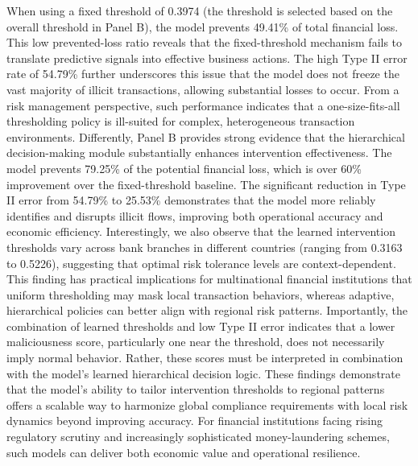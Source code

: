 \documentclass[11pt,english]{article}
\begin{document}
When using a fixed threshold of 0.3974 (the threshold is selected based on the overall threshold in Panel B), the model prevents 49.41\% of total financial loss. This low prevented-loss ratio reveals that the fixed-threshold mechanism fails to translate predictive signals into effective business actions. The high Type II error rate of 54.79\% further underscores this issue that the model does not freeze the vast majority of illicit transactions, allowing substantial losses to occur. From a risk management perspective, such performance indicates that a one-size-fits-all thresholding policy is ill-suited for complex, heterogeneous transaction environments. Differently, Panel B provides strong evidence that the hierarchical decision-making module substantially enhances intervention effectiveness. The model prevents 79.25\% of the potential financial loss, which is over 60\% improvement over the fixed-threshold baseline. The significant reduction in Type II error from 54.79\% to 25.53\% demonstrates that the model more reliably identifies and disrupts illicit flows, improving both operational accuracy and economic efficiency. Interestingly, we also observe that the learned intervention thresholds vary across bank branches in different countries (ranging from 0.3163 to 0.5226), suggesting that optimal risk tolerance levels are context-dependent. This finding has practical implications for multinational financial institutions that uniform thresholding may mask local transaction behaviors, whereas adaptive, hierarchical policies can better align with regional risk patterns. Importantly, the combination of learned thresholds and low Type II error indicates that a lower maliciousness score, particularly one near the threshold, does not necessarily imply normal behavior. Rather, these scores must be interpreted in combination with the model’s learned hierarchical decision logic. These findings demonstrate that the model’s ability to tailor intervention thresholds to regional patterns offers a scalable way to harmonize global compliance requirements with local risk dynamics beyond improving accuracy. For financial institutions facing rising regulatory scrutiny and increasingly sophisticated money-laundering schemes, such models can deliver both economic value and operational resilience.
\end{document}

